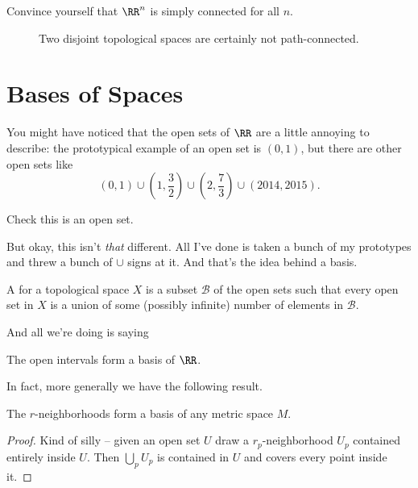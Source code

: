 \begin{ques}
	Convince yourself that $\RR^n$ is simply connected for all $n$.
\end{ques}

\begin{figure}[ht]
	\centering
	\caption{Two disjoint topological spaces are certainly not path-connected.}
\end{figure}

\section{Bases of Spaces}

You might have noticed that the open sets of $\RR$ are a little annoying to describe:
the prototypical example of an open set is $(0,1)$,
but there are other open sets like
\[
	(0,1)
	\cup \left( 1, \frac32 \right)
	\cup \left( 2, \frac 73 \right)
	\cup (2014, 2015). \]
\begin{ques}
	Check this is an open set.
\end{ques}

But okay, this isn't \emph{that} different.
All I've done is taken a bunch of my prototypes and threw a bunch of $\cup$ signs at it.
And that's the idea behind a basis.

\begin{definition}
	A  for a topological space $X$
	is a subset $\mathcal B$ of the open sets
	such that every open set in $X$
	is a union of some (possibly infinite) number of elements in
	$\mathcal B$.
\end{definition}

And all we're doing is saying
\begin{example}[Basis of $\RR$]
	The open intervals form a basis of $\RR$.
\end{example}
In fact, more generally we have the following result.
\begin{theorem}
	The $r$-neighborhoods form a basis of any metric space $M$.
\end{theorem}
\begin{proof}
	Kind of silly -- given an open set $U$
	draw a $r_p$-neighborhood $U_p$ contained entirely inside $U$.
	Then $\bigcup_p U_p$ is contained in $U$ and covers
	every point inside it.
\end{proof}

